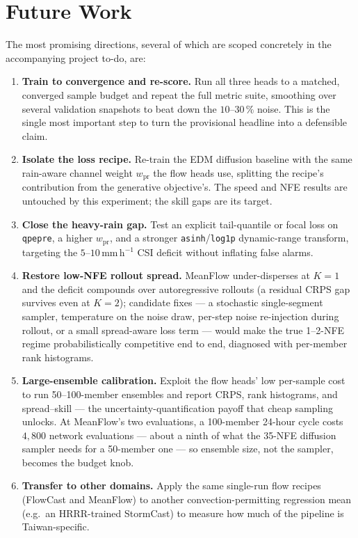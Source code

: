 \section{Future Work}
\label{sec:concl-future}

The most promising directions, several of which are scoped concretely in the accompanying project to-do, are:
\begin{enumerate}
  \item \textbf{Train to convergence and re-score.} Run all three heads to a matched, converged sample budget and repeat the full metric suite, smoothing over several validation snapshots to beat down the $10$--$30\,\%$ noise. This is the single most important step to turn the provisional headline into a defensible claim.
  \item \textbf{Isolate the loss recipe.} Re-train the EDM diffusion baseline with the same rain-aware channel weight $w_{\text{pr}}$ the flow heads use, splitting the recipe's contribution from the generative objective's. The speed and NFE results are untouched by this experiment; the skill gaps are its target.
  \item \textbf{Close the heavy-rain gap.} Test an explicit tail-quantile or focal loss on \texttt{qpepre}, a higher $w_{\text{pr}}$, and a stronger \texttt{asinh}/\texttt{log1p} dynamic-range transform, targeting the $5$--$10$\,mm\,h$^{-1}$ CSI deficit without inflating false alarms.
  \item \textbf{Restore low-NFE rollout spread.} MeanFlow under-disperses at $K = 1$ and the deficit compounds over autoregressive rollouts (a residual CRPS gap survives even at $K = 2$); candidate fixes --- a stochastic single-segment sampler, temperature on the noise draw, per-step noise re-injection during rollout, or a small spread-aware loss term --- would make the true 1--2-NFE regime probabilistically competitive end to end, diagnosed with per-member rank histograms.
  \item \textbf{Large-ensemble calibration.} Exploit the flow heads' low per-sample cost to run 50--100-member ensembles and report CRPS, rank histograms, and spread--skill --- the uncertainty-quantification payoff that cheap sampling unlocks. At MeanFlow's two evaluations, a 100-member 24-hour cycle costs $4{,}800$ network evaluations --- about a ninth of what the 35-NFE diffusion sampler needs for a 50-member one --- so ensemble size, not the sampler, becomes the budget knob.
  \item \textbf{Transfer to other domains.} Apply the same single-run flow recipes (FlowCast and MeanFlow) to another convection-permitting regression mean (e.g.\ an HRRR-trained StormCast) to measure how much of the pipeline is Taiwan-specific.
\end{enumerate}

